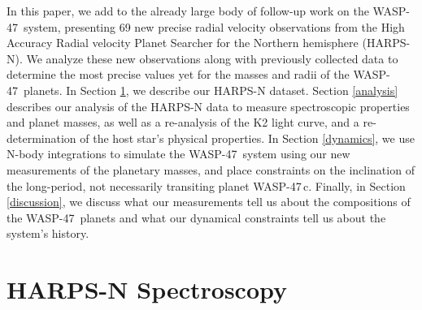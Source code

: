 \documentclass{emulateapj}
\newcommand{\ron}{\color{black}}
\newcommand{\thisstar}{WASP-47}
\newcommand{\thisfourthplanet}{WASP-47\,c}
\begin{document}
In this paper, we add to the already large body of follow-up work on the \thisstar\ system, presenting {\ron69} new precise radial velocity observations from the High Accuracy Radial velocity Planet Searcher for the Northern hemisphere (HARPS-N). We analyze these new observations along with previously collected data to determine the most precise values yet for the masses and radii of the \thisstar\ planets. In Section \ref{observations}, we describe our HARPS-N dataset. Section \ref{analysis} describes our analysis of the HARPS-N data to measure spectroscopic properties and planet masses, as well as a re-analysis of the K2 light curve, and a re-determination of the host star's physical properties. In Section \ref{dynamics}, we use N-body integrations to simulate the \thisstar\ system using our new measurements of the planetary masses, and place constraints on the inclination of the long-period, not necessarily transiting planet \thisfourthplanet. Finally, in Section \ref{discussion}, we discuss what our measurements tell us about the compositions of the \thisstar\ planets and what our dynamical constraints tell us about the system's history. 





\section{HARPS-N Spectroscopy}\label{observations}
\end{document}
